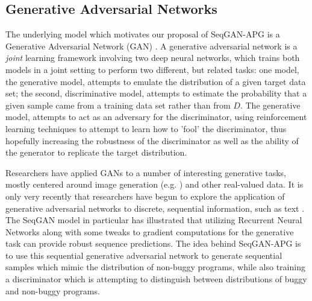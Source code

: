 \documentclass[sigconf]{acmart}
\begin{document}
\subsection{Generative Adversarial Networks}
\label{sec:gans}
The underlying model which motivates our proposal of SeqGAN-APG is a Generative Adversarial Network (GAN) \cite{goodfellow2014gan}. A generative adversarial network is a \textit{joint} learning framework involving two deep neural networks, which trains both models in a joint setting to perform two different, but related tasks: one model, the generative model, attempts to emulate the distribution of a given target data set; the second, discriminative model, attempts to estimate the probability that a given sample came from a training data set rather than from $D$. The generative model, attempts to act as an adversary for the discriminator, using reinforcement learning techniques to attempt to learn how to 'fool' the discriminator, thus hopefully increasing the robustness of the discriminator as well as the ability of the generator to replicate the target distribution.

Researchers have applied GANs to a number of interesting generative tasks, mostly centered around image generation (e.g. \cite{denton2015imagegan}) and other real-valued data. It is only very recently that researchers have begun to explore the application of generative adversarial networks to discrete, sequential information, such as text \cite{zhang2017adversarial, press2017langgan}. The SeqGAN \cite{yu2017seqgan} model in particular has illustrated that utilizing Recurrent Neural Networks along with some tweaks to gradient computations for the generative task can provide robust sequence predictions. The idea behind SeqGAN-APG is to use this sequential generative adversarial network to generate sequential samples which mimic the distribution of non-buggy programs, while also training a discriminator which is attempting to distinguish between distributions of buggy and non-buggy programs. %
\end{document}
